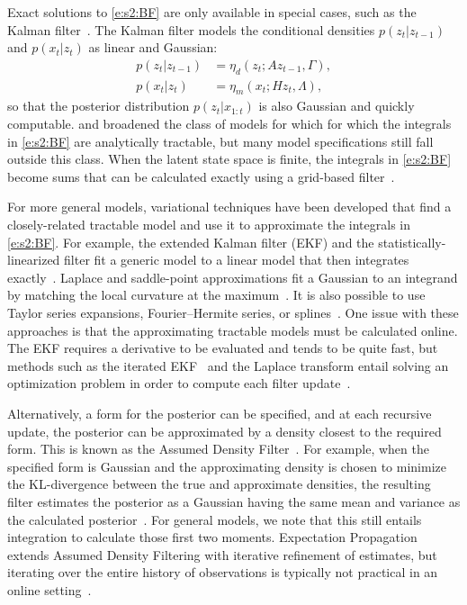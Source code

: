 Exact solutions to \eqref{e:s2:BF} are only available in special cases, such as the Kalman filter~\cite{Kal60,Kal61}. The Kalman filter models the conditional densities $p(z_t|z_{t-1})$ and $p(x_t|z_t)$ as linear and Gaussian:
\begin{align} 
\label{e:s2:ZZ-1} p(z_t|z_{t-1}) & = \eta_d(z_t;Az_{t-1},\Gamma),  \\
\label{e:s2:KF-X} p(x_t|z_t) & = \eta_m(x_t;Hz_t,\Lambda),
\end{align}
so that the posterior distribution $p(z_t|x_{1:t})$ is also Gaussian and quickly computable. \textcite{Ben81} and \textcite{Dau84,Dau86} broadened the class of models for which for which the integrals in \eqref{e:s2:BF} are analytically tractable, but many model specifications still fall outside this class.  When the latent state space is finite, the integrals in \eqref{e:s2:BF} become sums that can be calculated exactly using a grid-based filter~\cite{Ell94,Aru02}.

For more general models, variational techniques have been developed that find a closely-related tractable model and use it to approximate the integrals in \eqref{e:s2:BF}.  For example, the extended Kalman filter (EKF) and the statistically-linearized filter fit a generic model to a linear model that then integrates exactly~\cite{Gel74,Sar13}.  Laplace and saddle-point approximations fit a Gaussian to an integrand by matching the local curvature at the maximum~\cite{But07,Koy10, Qua15}.  It is also possible to use Taylor series expansions, Fourier--Hermite series, or splines~\cite{Sar12}.  One issue with these approaches is that the approximating tractable models must be calculated online.  The EKF requires a derivative to be evaluated and tends to be quite fast, but methods such as the iterated EKF~\cite{Fri66,Wis69} and the Laplace transform entail solving an optimization problem in order to compute each filter update~\cite{Bel93}.  

Alternatively, a form for the posterior can be specified, and at each recursive update, the posterior can be approximated by a density closest to the required form.  This is known as the Assumed Density Filter~\cite{Kus67,Min01b}.  For example, when the specified form is Gaussian and the approximating density is chosen to minimize the KL-divergence between the true and approximate densities, the resulting filter estimates the posterior as a Gaussian having the same mean and variance as the calculated posterior~\cite{Sar13}.  For general models, we note that this still entails integration to calculate those first two moments.  Expectation Propagation extends Assumed Density Filtering with iterative refinement of estimates, but iterating over the entire history of observations is typically not practical in an online setting~\cite{Min01,Min01b}.

